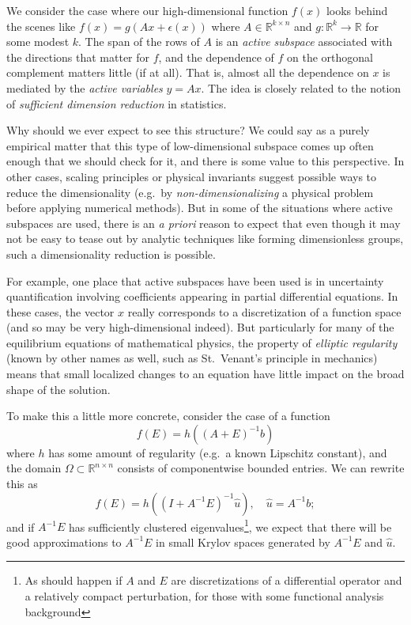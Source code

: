 \documentclass[12pt, leqno]{article} %
\begin{document}
We consider the case where our high-dimensional function $f(x)$ looks
behind the scenes like $f(x) = g(Ax+\epsilon(x))$ where $A \in
\mathbb{R}^{k \times n}$ and $g : \mathbb{R}^k \rightarrow \mathbb{R}$
for some modest $k$.  The span of the rows of $A$ is an
{\em active subspace} associated with the directions that matter for $f$,
and the dependence of $f$ on the orthogonal complement matters little
(if at all).  That is, almost all the dependence on $x$ is mediated by
the {\em active variables} $y = Ax$.  The idea is closely related to
the notion of {\em sufficient dimension reduction} in statistics.

Why should we ever expect to see this structure?  We could say as a
purely empirical matter that this type of low-dimensional subspace
comes up often enough that we should check for it, and there is some
value to this perspective.  In other cases, scaling principles or
physical invariants suggest possible ways to reduce the dimensionality
(e.g.~by {\em non-dimensionalizing} a physical problem before applying
numerical methods).  But in some of the situations where active
subspaces are used, there is an {\em a priori} reason to expect that
even though it may not be easy to tease out by analytic techniques
like forming dimensionless groups, such a dimensionality reduction is
possible.

For example, one place that active subspaces have been used is in
uncertainty quantification involving coefficients appearing in partial
differential equations.  In these cases, the vector $x$ really
corresponds to a discretization of a function space (and so may be
very high-dimensional indeed).  But particularly for many of the
equilibrium equations of mathematical physics, the property of
{\em elliptic regularity} (known by other names as well, such as
St.~Venant's principle in mechanics) means that small localized
changes to an equation have little impact on the broad shape of the
solution.

To make this a little more concrete, consider the case of a
function
\[
  f(E) = h((A+E)^{-1} b)
\]
where $h$ has some amount of regularity (e.g.~a known Lipschitz
constant), and the domain $\Omega \subset \mathbb{R}^{n \times n}$
consists of componentwise bounded entries.  We can rewrite this
as
\[
  f(E) = h((I+A^{-1} E)^{-1} \hat{u}), \quad \hat{u} = A^{-1} b;
\]
and if $A^{-1} E$ has sufficiently clustered
eigenvalues\footnote{As should
happen if $A$ and $E$ are discretizations of a differential operator
and a relatively compact perturbation, for those with some functional
analysis background},
we expect that there will be good approximations to $A^{-1} E$ in
small Krylov spaces generated by $A^{-1} E$ and $\hat{u}$.
\end{document}
